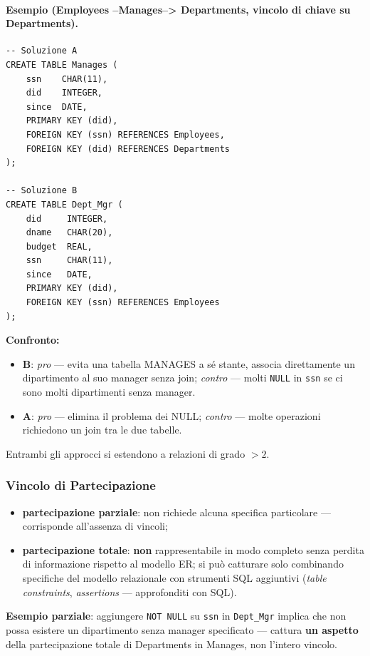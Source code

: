 \documentclass[12pt, a4paper]{article}
\begin{document}
\paragraph{Esempio (Employees --Manages--> Departments, vincolo di chiave su Departments).}
\begin{verbatim}
-- Soluzione A
CREATE TABLE Manages (
    ssn    CHAR(11),
    did    INTEGER,
    since  DATE,
    PRIMARY KEY (did),
    FOREIGN KEY (ssn) REFERENCES Employees,
    FOREIGN KEY (did) REFERENCES Departments
);

-- Soluzione B
CREATE TABLE Dept_Mgr (
    did     INTEGER,
    dname   CHAR(20),
    budget  REAL,
    ssn     CHAR(11),
    since   DATE,
    PRIMARY KEY (did),
    FOREIGN KEY (ssn) REFERENCES Employees
);
\end{verbatim}

\textbf{Confronto:}
\begin{itemize}
    \item \textbf{B}: \textit{pro} — evita una tabella MANAGES a sé stante, associa direttamente un dipartimento al suo manager senza join; \textit{contro} — molti \texttt{NULL} in \texttt{ssn} se ci sono molti dipartimenti senza manager.
    \item \textbf{A}: \textit{pro} — elimina il problema dei NULL; \textit{contro} — molte operazioni richiedono un join tra le due tabelle.
\end{itemize}
Entrambi gli approcci si estendono a relazioni di grado $>2$.

\subsubsection{Vincolo di Partecipazione}
\begin{itemize}
    \item \textbf{partecipazione parziale}: non richiede alcuna specifica particolare — corrisponde all'assenza di vincoli;
    \item \textbf{partecipazione totale}: \textbf{non} rappresentabile in modo completo senza perdita di informazione rispetto al modello ER; si può catturare solo combinando specifiche del modello relazionale con strumenti SQL aggiuntivi (\textit{table constraints}, \textit{assertions} — approfonditi con SQL).
\end{itemize}
\textbf{Esempio parziale}: aggiungere \texttt{NOT NULL} su \texttt{ssn} in \texttt{Dept\_Mgr} implica che non possa esistere un dipartimento senza manager specificato — cattura \textbf{un aspetto} della partecipazione totale di Departments in Manages, non l'intero vincolo.
\end{document}
